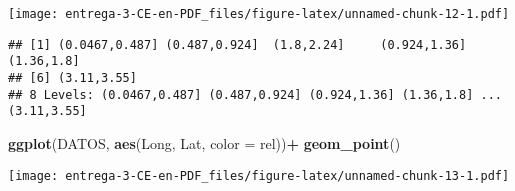 \documentclass[
]{article}
\newenvironment{Shaded}{\begin{snugshade}}{\end{snugshade}}
\newcommand{\DataTypeTok}[1]{\textcolor[rgb]{0.13,0.29,0.53}{#1}}
\newcommand{\DecValTok}[1]{\textcolor[rgb]{0.00,0.00,0.81}{#1}}
\newcommand{\KeywordTok}[1]{\textcolor[rgb]{0.13,0.29,0.53}{\textbf{#1}}}
\newcommand{\NormalTok}[1]{#1}
\newcommand{\OperatorTok}[1]{\textcolor[rgb]{0.81,0.36,0.00}{\textbf{#1}}}
\newcommand{\StringTok}[1]{\textcolor[rgb]{0.31,0.60,0.02}{#1}}
\begin{document}
\texttt{[image: entrega-3-CE-en-PDF\_files/figure-latex/unnamed-chunk-12-1.pdf]}

\begin{Shaded}
\end{Shaded}

\begin{verbatim}
## [1] (0.0467,0.487] (0.487,0.924]  (1.8,2.24]     (0.924,1.36]   (1.36,1.8]    
## [6] (3.11,3.55]   
## 8 Levels: (0.0467,0.487] (0.487,0.924] (0.924,1.36] (1.36,1.8] ... (3.11,3.55]
\end{verbatim}

\begin{Shaded}
\begin{Highlighting}[]
\KeywordTok{ggplot}\NormalTok{(DATOS, }\KeywordTok{aes}\NormalTok{(Long, Lat, }\DataTypeTok{color =}\NormalTok{ rel))}\OperatorTok{+}
\StringTok{  }\KeywordTok{geom_point}\NormalTok{()}
\end{Highlighting}
\end{Shaded}

\texttt{[image: entrega-3-CE-en-PDF\_files/figure-latex/unnamed-chunk-13-1.pdf]}

\begin{Shaded}
\end{Shaded}
\end{document}
